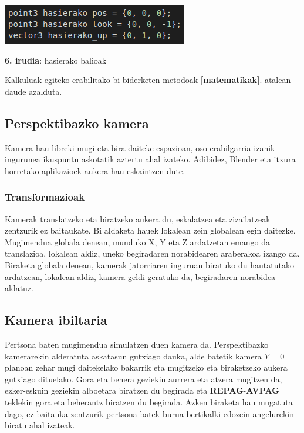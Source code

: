 \documentclass[12pt]{article}
\newcommand{\tekla}[1] {\textbf{#1}}
\newcommand{\erref}[1] {\textbf{\ref{#1}}}
\begin{document}
\begin{center}
\includegraphics[scale=0.65]{kamera_hasierako_balioak.png}

\textbf{6. irudia}: hasierako balioak
\end{center}

Kalkuluak egiteko erabilitako bi biderketen metodoak \erref{matematikak}. atalean daude azalduta.


\subsection{Perspektibazko kamera}

Kamera hau libreki mugi eta bira daiteke espazioan, oso erabilgarria izanik ingurunea ikuspuntu askotatik aztertu ahal izateko. Adibidez, Blender\cite{blender} eta itxura horretako aplikazioek aukera hau eskaintzen dute.

\subsubsection{Transformazioak}

Kamerak translatzeko eta biratzeko aukera du, eskalatzea eta zizailatzeak zentzurik ez baitaukate. Bi aldaketa hauek lokalean zein globalean egin daitezke. Mugimendua globala denean, munduko X, Y eta Z ardatzetan emango da translazioa, lokalean aldiz, uneko begiradaren norabidearen araberakoa izango da. Biraketa globala denean, kamerak jatorriaren inguruan biratuko du hautatutako ardatzean, lokalean aldiz, kamera geldi geratuko da, begiradaren norabidea aldatuz.

\subsection{Kamera ibiltaria}

Pertsona baten mugimendua simulatzen duen kamera da. Perspektibazko kamerarekin alderatuta askatasun gutxiago dauka, alde batetik kamera $Y=0$ planoan zehar mugi daitekelako bakarrik eta mugitzeko eta biraketzeko aukera gutxiago dituelako. Gora eta behera geziekin aurrera eta atzera mugitzen da, ezker-eskuin geziekin alboetara biratzen du begirada eta \tekla{REPAG}-\tekla{AVPAG} teklekin gora eta beherantz biratzen du begirada. Azken biraketa hau mugatuta dago, ez baitauka zentzurik pertsona batek burua bertikalki edozein angelurekin biratu ahal izateak.
\end{document}
